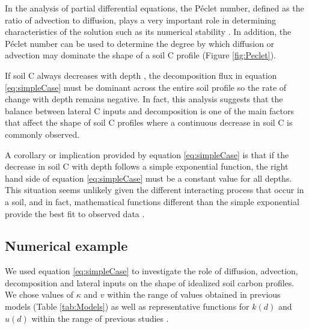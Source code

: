 \documentclass[11pt, oneside, a4paper]{article}   	%
\begin{document}
In the analysis of partial differential equations, the Péclet number, defined as the ratio of advection to diffusion, plays a very important role in determining characteristics of the solution such as its numerical stability \citep{LeVeque2007}. In addition, the Péclet number can be used to determine the degree by which diffusion or advection may dominate the shape of a soil C profile (Figure \ref{fig:Peclet}). 

If soil C always decreases with depth \citep{Jobbagy2000}, the decomposition flux in equation \ref{eq:simpleCase} must be dominant across the entire soil profile so the rate of change with depth remains negative. In fact, this analysis suggests that the balance between lateral C inputs and decomposition is one of the main factors that affect the shape of soil C profiles where a continuous decrease in soil C is commonly observed. 

A corollary or implication provided by equation \ref{eq:simpleCase} is that if the decrease in soil C with depth follows a simple exponential function, the right hand side of equation \ref{eq:simpleCase} must be a constant value for all depths. This situation seems unlikely given the different interacting process that occur in a soil, and in fact, mathematical functions different than the simple exponential provide the best fit to observed data \citep{Jobbagy2000}.

\subsection{Numerical example} \label{sec:ex1}
We used equation \ref{eq:simpleCase} to investigate the role of diffusion, advection, decomposition and lateral inputs on the shape of idealized soil carbon profiles. 
We chose values of $\kappa$ and $v$ within the range of values obtained in previous models (Table \ref{tab:Models}) as well as representative functions for $k(d)$ and $u(d)$ within the range of previous studies \citep[e.g.][]{Elzein1995, Jackson1996, Jackson1997,Koven2013BGS}.
\end{document}
